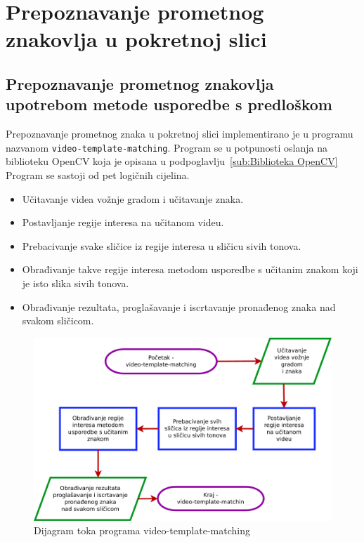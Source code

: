 \newpage
\setcounter{figure}{0}

\section{Prepoznavanje prometnog znakovlja u pokretnoj slici} %
\label{sec:Prepoznavanje prometnog}

\subsection{Prepoznavanje prometnog znakovlja upotrebom metode usporedbe
s predloškom} %
\label{sub:Prepoznavanje prometnog znakovlja upotrebom metode uspore}

Prepoznavanje prometnog znaka u pokretnoj slici implementirano je u
programu nazvanom \texttt{video-template-matching}. Program se u
potpunosti oslanja na biblioteku OpenCV koja je opisana u
podpoglavlju~\ref{sub:Biblioteka OpenCV} Program se sastoji od pet
logičnih cijelina. 

\begin{itemize}
    \item Učitavanje videa vožnje gradom i učitavanje znaka.
    \item Postavljanje regije interesa na učitanom videu.
    \item Prebacivanje svake sličice iz regije interesa u sličicu sivih
        tonova. 
    \item Obrađivanje takve regije interesa metodom usporedbe s učitanim
        znakom koji je isto slika sivih tonova.
    \item Obrađivanje rezultata, proglašavanje i iscrtavanje pronađenog
        znaka nad svakom sličicom.
\end{itemize}

\begin{figure}[h]
\centering
\includegraphics[scale=0.4]{figures/dijagramtoka.pdf}
\caption{Dijagram toka programa video-template-matching}
\label{fig:dijagramtoka.pdf}
\end{figure}


